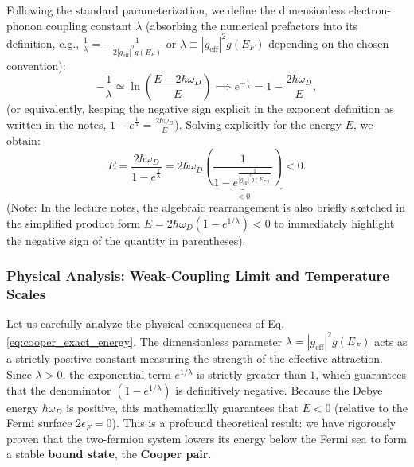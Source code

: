 Following the standard parameterization, we define the dimensionless electron-phonon coupling constant \( \lambda \) (absorbing the numerical prefactors into its definition, e.g., \( \frac{1}{\lambda} = -\frac{1}{2|g_{\text{eff}}|^2 g(E_F)} \) or \( \lambda \equiv |g_{\text{eff}}|^2 g(E_F) \) depending on the chosen convention):
\[
    -\frac{1}{\lambda} \simeq \ln\left( \frac{E - 2\hbar\omega_D}{E} \right) \implies e^{-\frac{1}{\lambda}} = 1 - \frac{2\hbar\omega_D}{E},
\]
(or equivalently, keeping the negative sign explicit in the exponent definition as written in the notes, \( 1 - e^{\frac{1}{\lambda}} = \frac{2\hbar\omega_D}{E} \)). Solving explicitly for the energy \( E \), we obtain:
\begin{equation} \label{eq:cooper_exact_energy}
    E = \frac{2\hbar\omega_D}{1 - e^{\frac{1}{\lambda}}} = 2\hbar\omega_D \underbrace{\left( \frac{1}{1 - e^{\frac{1}{|g_{\text{eff}}|^2 g(E_F)}}} \right)}_{< 0} < 0.
\end{equation}
(Note: In the lecture notes, the algebraic rearrangement is also briefly sketched in the simplified product form \( E = 2\hbar\omega_D (1 - e^{1/\lambda}) < 0 \) to immediately highlight the negative sign of the quantity in parentheses).

\subsubsection{Physical Analysis: Weak-Coupling Limit and Temperature Scales}

Let us carefully analyze the physical consequences of Eq. \eqref{eq:cooper_exact_energy}. The dimensionless parameter \( \lambda = |g_{\text{eff}}|^2 g(E_F) \) acts as a strictly positive constant measuring the strength of the effective attraction. Since \( \lambda > 0 \), the exponential term \( e^{1/\lambda} \) is strictly greater than \( 1 \), which guarantees that the denominator \( (1 - e^{1/\lambda}) \) is definitively negative. Because the Debye energy \( \hbar\omega_D \) is positive, this mathematically guarantees that \textbf{\( E < 0 \)} (relative to the Fermi surface \( 2\epsilon_F = 0 \)). This is a profound theoretical result: we have rigorously proven that the two-fermion system lowers its energy below the Fermi sea to form a stable \textbf{bound state}, the \textbf{Cooper pair}.

